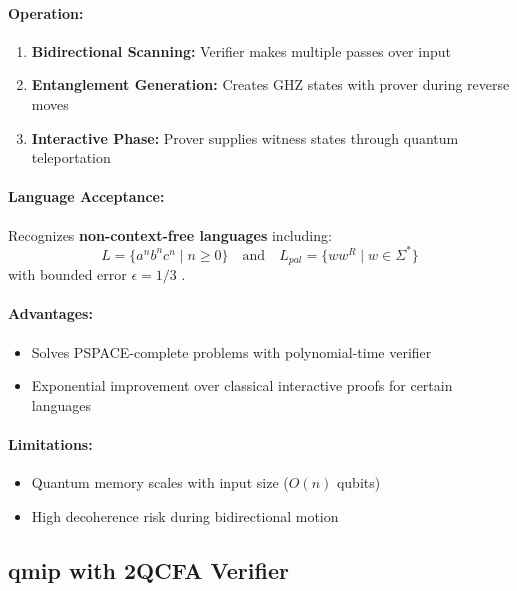 \paragraph{Operation:}
\begin{enumerate}
    \item \textbf{Bidirectional Scanning:} Verifier makes multiple passes over input
    \item \textbf{Entanglement Generation:} Creates GHZ states with prover during reverse moves
    \item \textbf{Interactive Phase:} Prover supplies witness states through quantum teleportation
\end{enumerate}

\paragraph{Language Acceptance:}
Recognizes \textbf{non-context-free languages} including:
\[
L = \{a^nb^nc^n \mid n \geq 0\} \quad \text{and} \quad L_{pal} = \{ww^R \mid w \in \Sigma^*\}
\]
with bounded error $\epsilon = 1/3$ \cite{zheng2012two}.

\paragraph{Advantages:}
\begin{itemize}
    \item Solves PSPACE-complete problems with polynomial-time verifier
    \item Exponential improvement over classical interactive proofs for certain languages
\end{itemize}

\paragraph{Limitations:}
\begin{itemize}
    \item Quantum memory scales with input size ($O(n)$ qubits)
    \item High decoherence risk during bidirectional motion
\end{itemize}

\subsection{\acrfull{qmip} with 2QCFA Verifier}
\label{subsec:qmip2qcfa}

